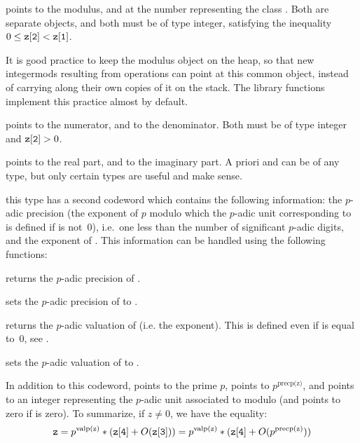  points to the modulus, and  at the number representing
the class . Both are separate  objects, and both must be of
type integer, satisfying the inequality $0 \le {\tt z[2]} < {\tt z[1]}$.

It is good practice to keep the modulus object on the heap, so that new
integermods resulting from operations can point at this common object,
instead of carrying along their own copies of it on the stack. The library
functions implement this practice almost by default.

%
 points to the numerator, and  to the denominator. Both
must be of type integer and ${\tt z[2]} > 0$.

%
 points to the real part, and  to the imaginary part. A
priori  and  can be of any type, but only certain types
are useful and make sense.

%
 this type has a second codeword
\kbd{[1]} which contains the following information: the $p$-adic precision
(the exponent of $p$ modulo which the $p$-adic unit corresponding to
 is defined if  is not~0), i.e.~one less than the number of
significant $p$-adic digits, and the exponent of . This information
can be handled using the following functions:

 returns the $p$-adic precision of .

 sets the $p$-adic precision of 
to .

 returns the $p$-adic valuation of  (i.e. the
exponent). This is defined even if  is equal to~0, see
.

 sets the $p$-adic valuation of 
to .

In addition to this codeword,  points to the prime $p$,
 points to $p^{\text{precp(z)}}$, and  points to an
integer representing the $p$-adic unit associated to  modulo
 (and points to zero if  is zero). To summarize, if $z\neq
0$, we have the equality:
$$ {\tt z} = p^{{\rm valp(z)}} * ({\tt z[4]} + O({\tt z[3]})) =
     p^{{\rm valp(z)}} * ({\tt z[4]} + O(p^{{\rm precp(z)}})) $$

